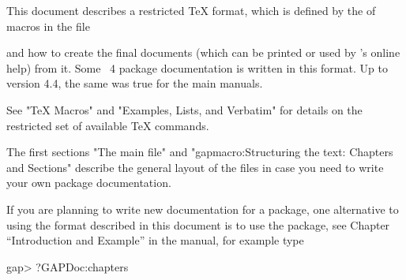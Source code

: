 
\OneColumnTableOfContents
\FrontMatter

\Chapters


This document describes a restricted {\TeX} format,
which is defined by the of macros in the file


and how to create the final documents (which can be printed or used by
{\GAP}'s online help) from it.
Some {\GAP}~4 package documentation is written in this format.
Up to version 4.4, the same was true for the main {\GAP} manuals.

See "TeX Macros" and "Examples, Lists, and Verbatim" for details  on  the
restricted set of available {\TeX} commands.

The first sections "The main file" and
"gapmacro:Structuring the text: Chapters and Sections" describe
the  general  layout of the  files  in case  you need to   write your own
package documentation.

If you are planning to write new documentation for a {\GAP} package,
one alternative to using the format described in this document
is to use the  package,
see Chapter ``Introduction and Example''
in the  manual,
for example type

\testexamplefalse
\beginexample
gap> ?GAPDoc:chapters
\endexample

